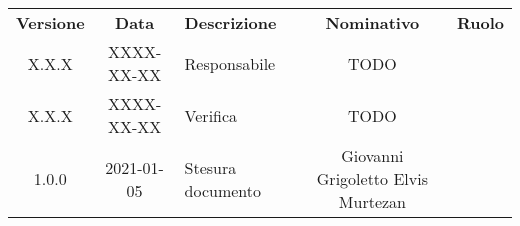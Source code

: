 {
    \renewcommand{\arraystretch}{1.5}
    \centering
    \begin{longtable}{ c c  C{4cm}  c  c }
        \rowcolor{\primaryColor}
        \textcolor{\secondaryColor}{
        \textbf{Versione}}     & \textcolor{\secondaryColor}{\textbf{Data}}       & \textcolor{\secondaryColor}
        {\textbf{Descrizione}} & \textcolor{\secondaryColor}{\textbf{Nominativo}} & \textcolor{\secondaryColor}{\textbf{Ruolo}}                          \\


        X.X.X  & 
        XXXX-XX-XX  & 
        Responsabile & 
        TODO & 
        \responsabile{} \\

        X.X.X  & 
        XXXX-XX-XX & 
        Verifica & 
        TODO & 
        \verificatore{} \\
        
        1.0.0  & 
        2021-01-05 & 
        Stesura documento & 
        Giovanni Grigoletto \newline Elvis Murtezan  & 
        \redattore{} \\
    \end{longtable}
}
